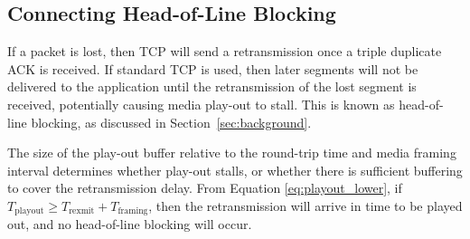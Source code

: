 \subsection{Connecting Head-of-Line Blocking}
\label{subsec:HoL}

If a packet is lost, then TCP will send a retransmission once a triple
duplicate ACK is received. If standard TCP is used, then later segments
will not be delivered to the application until the retransmission of the
lost segment is received, potentially causing media play-out to stall.
This is known as head-of-line blocking, as discussed in Section~\ref{sec:background}.

The size of the play-out buffer relative to the round-trip time and media
framing interval determines whether play-out stalls, or whether there is
sufficient buffering to cover the retransmission delay. From
Equation \ref{eq:playout_lower}, if
$T_\mathrm{playout} \geq T_\mathrm{rexmit} + T_\mathrm{framing}$, then the
retransmission will arrive in time to be played out, and no head-of-line
blocking will occur.

%


